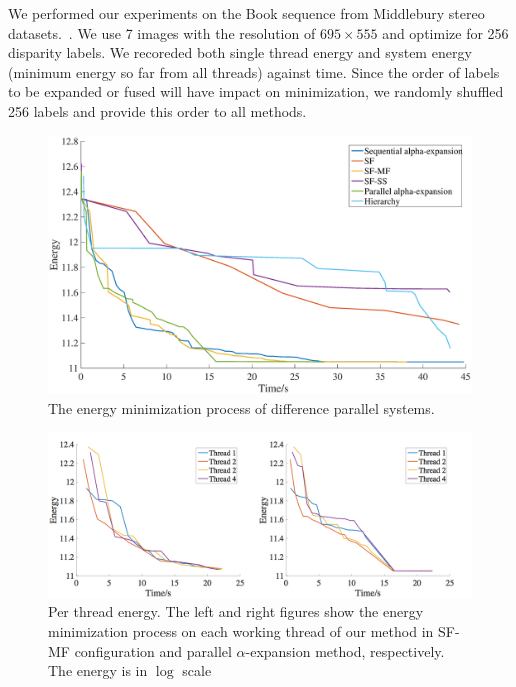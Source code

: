 
We performed our experiments on the Book sequence from Middlebury stereo
datasets.~\cite{middlebury_stereo}. We use 7 images with the
resolution of $695\times555$ and optimize for 256 disparity labels. We
recoreded both single thread energy and system energy (minimum energy
so far from all threads) against time. Since the order of labels to be
expanded or fused will have impact on minimization, we randomly
shuffled 256 labels and provide this order to all methods.

\begin{figure}[tb]
  \includegraphics[width=\columnwidth]{figure/stereo_global.eps}
  \caption{The energy minimization process of difference parallel systems.}
  \label{fig:stereo_global}
\end{figure}

\begin{figure}[tb]
  \includegraphics[width=\columnwidth]{figure/stereo_threads.png}
  \caption{Per thread energy. The left and right figures show the
    energy minimization process on each working thread of our method
    in SF-MF configuration and parallel $\alpha$-expansion method,
    respectively. The energy is in $\log$ scale}
  \label{fig:stereo_threads}
\end{figure}


